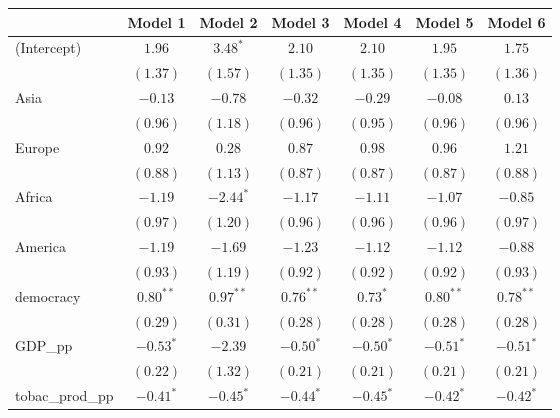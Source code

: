 
\begin{table}[!h]
\begin{center}
\begin{tabular}{l c c c c c c }
\toprule
 & Model 1 & Model 2 & Model 3 & Model 4 & Model 5 & Model 6 \\
\midrule
(Intercept)             & $1.96$       & $3.48^{*}$  & $2.10$       & $2.10$       & $1.95$       & $1.75$       \\
                        & $(1.37)$     & $(1.57)$    & $(1.35)$     & $(1.35)$     & $(1.35)$     & $(1.36)$     \\
Asia                    & $-0.13$      & $-0.78$     & $-0.32$      & $-0.29$      & $-0.08$      & $0.13$       \\
                        & $(0.96)$     & $(1.18)$    & $(0.96)$     & $(0.95)$     & $(0.96)$     & $(0.96)$     \\
Europe                  & $0.92$       & $0.28$      & $0.87$       & $0.98$       & $0.96$       & $1.21$       \\
                        & $(0.88)$     & $(1.13)$    & $(0.87)$     & $(0.87)$     & $(0.87)$     & $(0.88)$     \\
Africa                  & $-1.19$      & $-2.44^{*}$ & $-1.17$      & $-1.11$      & $-1.07$      & $-0.85$      \\
                        & $(0.97)$     & $(1.20)$    & $(0.96)$     & $(0.96)$     & $(0.96)$     & $(0.97)$     \\
America                 & $-1.19$      & $-1.69$     & $-1.23$      & $-1.12$      & $-1.12$      & $-0.88$      \\
                        & $(0.93)$     & $(1.19)$    & $(0.92)$     & $(0.92)$     & $(0.92)$     & $(0.93)$     \\
democracy               & $0.80^{**}$  & $0.97^{**}$ & $0.76^{**}$  & $0.73^{*}$   & $0.80^{**}$  & $0.78^{**}$  \\
                        & $(0.29)$     & $(0.31)$    & $(0.28)$     & $(0.28)$     & $(0.28)$     & $(0.28)$     \\
GDP\_pp                 & $-0.53^{*}$  & $-2.39$     & $-0.50^{*}$  & $-0.50^{*}$  & $-0.51^{*}$  & $-0.51^{*}$  \\
                        & $(0.22)$     & $(1.32)$    & $(0.21)$     & $(0.21)$     & $(0.21)$     & $(0.21)$     \\
tobac\_prod\_pp         & $-0.41^{*}$  & $-0.45^{*}$ & $-0.44^{*}$  & $-0.45^{*}$  & $-0.42^{*}$  & $-0.42^{*}$  \\

\end{tabular}
\end{center}
\end{table}
